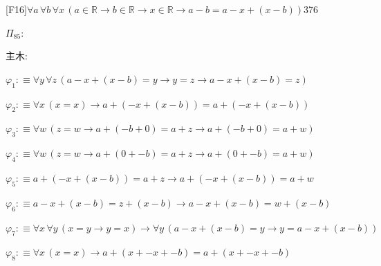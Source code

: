 \begin{fullproof}{[F16]}{$\forall a\,\forall b\,\forall x\,(a \in \mathbb{R} \to b \in \mathbb{R} \to x \in \mathbb{R} \to a - b = a - x + (x - b))$}{376}
\begin{ptree}
\end{ptree}
\noindent$\Pi_{85}$:
\begin{ptree}
\noLine
{}
\noLine
{}
\end{ptree}
\noindent 主木:
\begin{ptree}
\noLine
{}
\noLine
{}
\end{ptree}
\begin{abbrevlist}
\item $\varphi_{1} :\equiv \forall y\,\forall z\,(a - x + (x - b) = y \to y = z \to a - x + (x - b) = z)$
\item $\varphi_{2} :\equiv \forall x\,(x = x) \to a + (-x + (x - b)) = a + (-x + (x - b))$
\item $\varphi_{3} :\equiv \forall w\,(z = w \to a + (-b + 0) = a + z \to a + (-b + 0) = a + w)$
\item $\varphi_{4} :\equiv \forall w\,(z = w \to a + (0 + -b) = a + z \to a + (0 + -b) = a + w)$
\item $\varphi_{5} :\equiv a + (-x + (x - b)) = a + z \to a + (-x + (x - b)) = a + w$
\item $\varphi_{6} :\equiv a - x + (x - b) = z + (x - b) \to a - x + (x - b) = w + (x - b)$
\item $\varphi_{7} :\equiv \forall x\,\forall y\,(x = y \to y = x) \to \forall y\,(a - x + (x - b) = y \to y = a - x + (x - b))$
\item $\varphi_{8} :\equiv \forall x\,(x = x) \to a + (x + -x + -b) = a + (x + -x + -b)$

\end{abbrevlist}
\end{fullproof}
